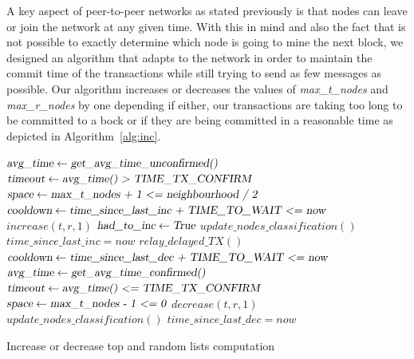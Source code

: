 \documentclass{dads}   %
\begin{document}
A key aspect of peer-to-peer networks as stated previously is that nodes can leave or join the network at any given time. With this in mind and also the fact that is not possible to exactly determine which node is going to mine the next block, we designed an algorithm that adapts to the network in order to maintain the commit time of the transactions while still trying to send as few messages as possible. Our algorithm increases or decreases the values of \textsl{max\_t\_nodes} and \textsl{max\_r\_nodes} by one depending if either, our transactions are taking too long to be committed to a bock or if they are being committed in a reasonable time as depicted in Algorithm~\ref{alg:inc}.

\begin{algorithm}[t]
\begin{algorithmic}[1]
\State $\textsl{avg\_time} \gets \textsl{get\_avg\_time\_unconfirmed()}$
\State $\textsl{timeout} \gets \textsl{avg\_time() > TIME\_TX\_CONFIRM}$
\State $\textsl{space} \gets \textsl{max\_t\_nodes + 1 <= neighbourhood / 2}$
\State $\textsl{cooldown} \gets \textsl{time\_since\_last\_inc + TIME\_TO\_WAIT <= now}$
  \State $increase(t, r, 1)$
  \State $\textsl{had\_to\_inc} \gets \textsl{True}$
  \State $update\_nodes\_classification()$
  \State $time\_since\_last\_inc = now$
  \State $relay\_delayed\_TX()$
\EndIf
\State $\textsl{cooldown} \gets \textsl{time\_since\_last\_dec + TIME\_TO\_WAIT <= now}$
  \State $\textsl{avg\_time} \gets \textsl{get\_avg\_time\_confirmed()}$
  \State $\textsl{timeout} \gets \textsl{avg\_time() <= TIME\_TX\_CONFIRM}$
  \State $\textsl{space} \gets \textsl{max\_t\_nodes - 1 <= 0}$
    \State $decrease(t, r, 1)$
    \State $update\_nodes\_classification()$
    \State $time\_since\_last\_dec = now$
  \EndIf
\EndIf
\EndFunction
\end{algorithmic}
\caption{Increase or decrease top and random lists computation}
\label{alg:inc}
\end{algorithm}
\end{document}

